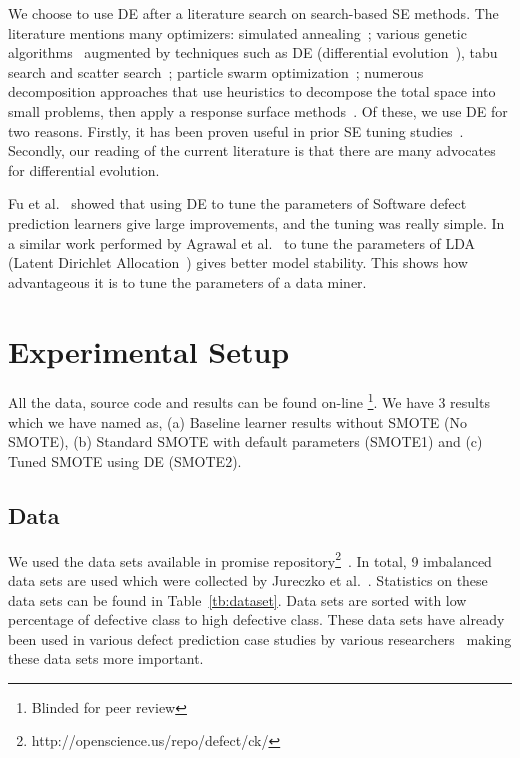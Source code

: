 \documentclass[sigconf,review, anonymous]{acmart}
\theoremstyle{break}
\theoremstyle{break}
\begin{document}
We choose to use DE after a literature search on search-based SE methods.
The literature mentions many optimizers: simulated
annealing~\cite{feather2002converging, menzies2007business}; various genetic
algorithms~\cite{goldberg1979complexity} augmented by techniques such as
DE (differential evolution~\cite{storn1997differential}), tabu search and scatter
search~\cite{glover1986general, beausoleil2006moss, molina2007sspmo,nebro2008abyss}; particle swarm optimization~\cite{pan2008particle}; numerous
decomposition approaches that use heuristics to decompose the total space into
small problems, then apply a response surface methods~\cite{krall2015gale, zuluaga2013active}.
Of these, we use DE for two reasons. Firstly, it has been proven useful in prior SE tuning
studies~\cite{fu2016tuning, agrawal2016wrong}. Secondly, our reading of the current literature is
that there are many advocates for differential evolution.

Fu et al.~\cite{fu2016tuning} showed that using DE to tune the parameters of Software defect prediction learners give large improvements, and the tuning was really simple. In a similar work performed by Agrawal et al.~\cite{agrawal2016wrong} to tune the parameters of LDA (Latent Dirichlet Allocation~\cite{blei2003latent}) gives better model stability. This shows how advantageous it is to tune the parameters of a data miner.

\section{Experimental Setup}
\label{sect:experiment}

All the data, source code and results can be found on-line
\footnote{Blinded for peer review}.
We have 3 results which we have named as, (a) Baseline learner results without SMOTE (No SMOTE), (b) Standard SMOTE with default parameters (SMOTE1) and (c) Tuned SMOTE using DE (SMOTE2).

\subsection{\textbf{Data}}
 We used the data sets available in promise repository\footnote{http://openscience.us/repo/defect/ck/}~\cite{promiserepo}. In total, 9 imbalanced data sets are used which were collected by Jureczko et al.~\cite{jureczko2010towards}. Statistics on these data sets can be found in Table~\ref{tb:dataset}. Data sets are sorted with low percentage of defective class to high defective class. These data sets have already been used in various defect prediction case studies by various researchers~\cite{he2012investigation,peters2013better,peters2013balancing,turhan2013empirical} making these data sets more important.
 
\end{document}
